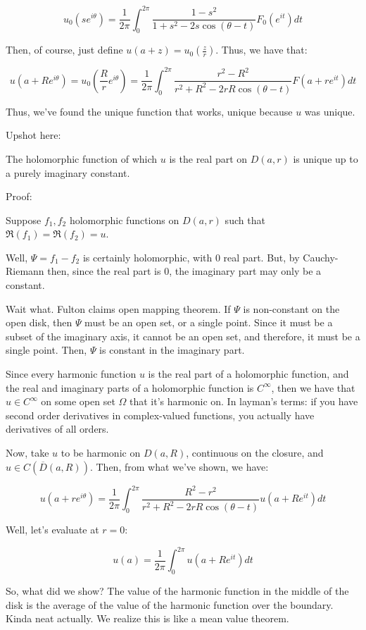 \documentclass[10pt]{article}
\begin{document}
$$u_0(se^{i\theta}) = \frac{1}{2\pi} \int_0^{2\pi} \frac{1 - s^2}{1 + s^2 - 2s \cos(\theta - t)} F_0(e^{it}) dt $$

Then, of course, just define $u(a + z) = u_0(\frac{z}{r})$. Thus, we have that:

$$u(a + Re^{i\theta}) = u_0(\frac{R}{r} e^{i\theta}) = \frac{1}{2\pi} \int_0^{2\pi} \frac{r^2 - R^2}{r^2 + R^2 - 2rR \cos(\theta - t)} F(a + re^{it}) dt $$

Thus, we’ve found the unique function that works, unique because $u$ was unique. 

Upshot here:

The holomorphic function of which $u$ is the real part on $D(a,r)$ is unique up to a purely imaginary constant. 

Proof:

Suppose $f_1, f_2$ holomorphic functions on $D(a,r)$ such that $\Re(f_1) = \Re(f_2) = u$.

Well, $\Psi = f_1 - f_2$ is certainly holomorphic, with 0 real part. But, by Cauchy-Riemann then, since the real part is $0$, the imaginary part may only be a constant. 

Wait what. Fulton claims open mapping theorem. If $\Psi$ is non-constant on the open disk, then $\Psi$ must be an open set, or a single point. Since it must be a subset of the imaginary axis, it cannot be an open set, and therefore, it must be a single point. Then, $\Psi$ is constant in the imaginary part. 

Since every harmonic function $u$ is the real part of a holomorphic function, and the real and imaginary parts of a holomorphic function is $C^\infty$, then we have that $u \in C^\infty$ on some open set $\Omega$ that it’s harmonic on. In layman’s terms: if you have second order derivatives in complex-valued functions, you actually have derivatives of all orders. 

Now, take $u$ to be harmonic on $D(a,R)$, continuous on the closure, and $u \in C(\overline{D}(a,R))$. Then, from what we’ve shown, we have:

$$u(a + re^{i\theta}) = \frac{1}{2\pi} \int_0^{2\pi} \frac{R^2 - r^2}{r^2 + R^2 - 2rR \cos(\theta - t)} u(a + Re^{it}) dt $$

Well, let’s evaluate at $r = 0$:

$$u(a) = \frac{1}{2\pi} \int_0^{2\pi}  u(a + Re^{it}) dt $$

So, what did we show? The value of the harmonic function in the middle of the disk is the average of the value of the harmonic function over the boundary. Kinda neat actually. We realize this is like a mean value theorem.
\end{document}
